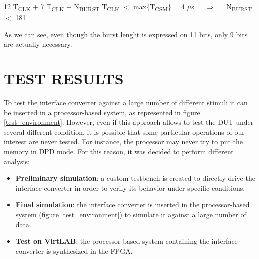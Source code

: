 \documentclass[10pt, english, a4paper, titlepage, oneside]{book}
\begin{document}
\vspace{4mm}
\begin{center}
    12 T\textsubscript{CLK} + 7 T\textsubscript{CLK} + N\textsubscript{BURST} T\textsubscript{CLK} $<$ max\{T\textsubscript{CSM}\} = 4 $\mu$s $\hspace{5mm} \Rightarrow \hspace{5mm}$ N\textsubscript{BURST} $<$ 181
    \vspace{4mm}
\end{center}
As we can see, even though the burst lenght is expressed on 11 bits, only 9 bits are actually necessary.

\chapter{TEST RESULTS} \label{test result}
\noindent To test the interface converter against a large number of different stimuli it can be inserted in a processor-based system, as represented in figure \ref{test_environment}. However, even if this approach allows to test the \acrshort{DUT} under several different condition, it is possible that some particular operations of our interest are never tested. For instance, the processor may never try to put the memory in DPD mode. For this reason, it was decided to perform different analysis:
\vspace{2mm}
\begin{itemize}
    \item \textbf{Preliminary simulation}: a custom testbench is created to directly drive the interface converter in order to verify its behavior under specific conditions.
    \vspace{1mm}
    \item \textbf{Final simulation}: the interface converter is inserted in the processor-based system (figure \ref{test_environment}) to simulate it against a large number of data.
    \vspace{1mm}
    \item \textbf{Test on VirtLAB}: the processor-based system containing the interface converter is synthesized in the FPGA.
\end{itemize}
\vspace{4mm}
\end{document}
